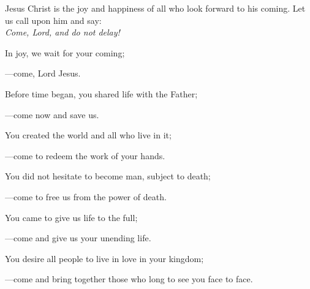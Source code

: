 \intercessions\indent

\begin{hangpar}

Jesus Christ is the joy and happiness of all who look forward to his coming. Let us call upon him and say:\\
\emph{Come, Lord, and do not delay!}

\medskip In joy, we wait for your coming;

{\color{red}---\thinspace}come, Lord Jesus.

\medskip Before time began, you shared life with the Father;

{\color{red}---\thinspace}come now and save us.

\medskip You created the world and all who live in it;

{\color{red}---\thinspace}come to redeem the work of your hands.

\medskip You did not hesitate to become man, subject to death;

{\color{red}---\thinspace}come to free us from the power of death.

\medskip You came to give us life to the full;

{\color{red}---\thinspace}come and give us your unending life.

\medskip You desire all people to live in love in your kingdom;

{\color{red}---\thinspace}come and bring together those who long to see you face to face.

\end{hangpar}